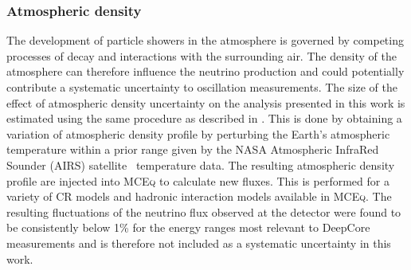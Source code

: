 
\subsubsection{Atmospheric density}

The development of particle showers in the atmosphere is governed by competing processes of decay and interactions with the surrounding air. The density of the atmosphere can therefore influence the neutrino production and could potentially contribute a systematic uncertainty to oscillation measurements. The size of the effect of atmospheric density uncertainty on the analysis presented in this work is estimated using the same procedure as described in \cite{MEOWS}. This is done by obtaining a variation of atmospheric density profile by perturbing the Earth’s atmospheric temperature within a prior range given by the NASA Atmospheric InfraRed Sounder (AIRS) satellite~\cite{AIRS} temperature data. The resulting atmospheric density profile are injected into \textsc{MCEq} to calculate new fluxes. This is performed for a variety of CR models and hadronic interaction models available in \textsc{MCEq}. The resulting fluctuations of the neutrino flux observed at the detector were found to be consistently below 1\% for the energy ranges most relevant to DeepCore measurements and is therefore not included as a systematic uncertainty in this work.



